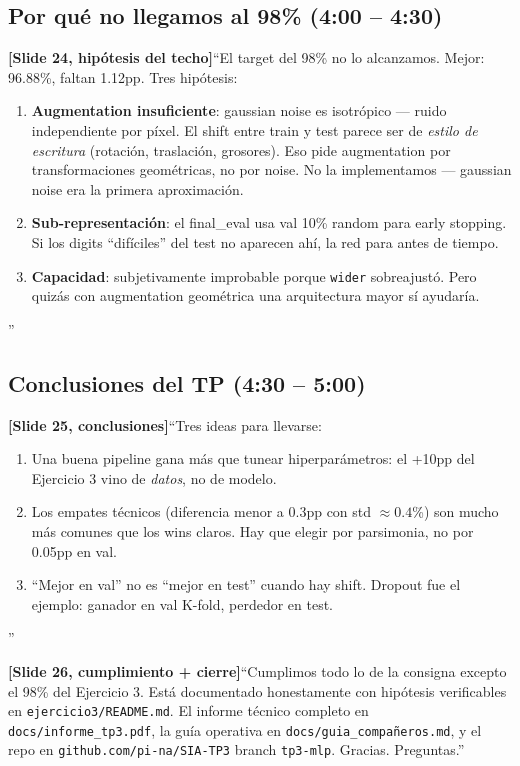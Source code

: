 \documentclass[11pt,a4paper]{article}
\newcommand{\code}[1]{\texttt{\textcolor{accent}{#1}}}
\newcommand{\file}[1]{\texttt{\small #1}}
\newcommand{\slidenum}[1]{\textcolor{accent}{\textbf{[Slide #1]}}}
\newcommand{\timing}[1]{\textcolor{muted}{\small (#1)}}
\begin{document}
\subsection{Por qué no llegamos al 98\% \timing{4:00 -- 4:30}}

\slidenum{24, hipótesis del techo}\quad ``El target del 98\% no lo alcanzamos. Mejor: 96.88\%, faltan 1.12pp. Tres hipótesis:

\begin{enumerate}[leftmargin=1.4em, itemsep=1pt]
  \item \textbf{Augmentation insuficiente}: gaussian noise es isotrópico --- ruido independiente por píxel. El shift entre train y test parece ser de \emph{estilo de escritura} (rotación, traslación, grosores). Eso pide augmentation por transformaciones geométricas, no por noise. No la implementamos --- gaussian noise era la primera aproximación.
  \item \textbf{Sub-representación}: el final\_eval usa val 10\% random para early stopping. Si los digits ``difíciles'' del test no aparecen ahí, la red para antes de tiempo.
  \item \textbf{Capacidad}: subjetivamente improbable porque \code{wider} sobreajustó. Pero quizás con augmentation geométrica una arquitectura mayor sí ayudaría.
\end{enumerate}''

\subsection{Conclusiones del TP \timing{4:30 -- 5:00}}

\slidenum{25, conclusiones}\quad ``Tres ideas para llevarse:

\begin{enumerate}[leftmargin=1.4em, itemsep=1pt]
  \item Una buena pipeline gana más que tunear hiperparámetros: el +10pp del Ejercicio 3 vino de \emph{datos}, no de modelo.
  \item Los empates técnicos (diferencia menor a 0.3pp con std $\approx 0.4$\%) son mucho más comunes que los wins claros. Hay que elegir por parsimonia, no por 0.05pp en val.
  \item ``Mejor en val'' no es ``mejor en test'' cuando hay shift. Dropout fue el ejemplo: ganador en val K-fold, perdedor en test.
\end{enumerate}''

\slidenum{26, cumplimiento + cierre}\quad ``Cumplimos todo lo de la consigna excepto el 98\% del Ejercicio 3. Está documentado honestamente con hipótesis verificables en \file{ejercicio3/README.md}. El informe técnico completo en \file{docs/informe\_tp3.pdf}, la guía operativa en \file{docs/guia\_compañeros.md}, y el repo en \file{github.com/pi-na/SIA-TP3} branch \code{tp3-mlp}. Gracias. Preguntas.''
\end{document}

